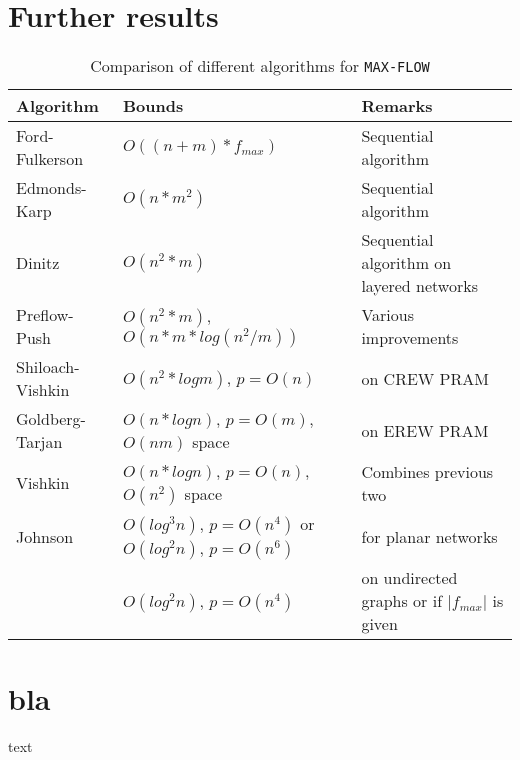 \documentclass[a4paper,10pt, twocolumn]{article}
\begin{document}
\section{Further results}
\label{sec:further}

\begin{table*}
\begin{tabular}{|l|l|l|}
\hline
Algorithm & Bounds & Remarks \\
\hline
Ford-Fulkerson\cite{ahuja93} & $O((n+m) * f_{max})$ & Sequential algorithm \\
Edmonds-Karp\cite{ahuja93} & $O(n*m^2)$ & Sequential algorithm  \\
Dinitz\cite{dinitz70}& $O(n^2*m)$ & Sequential algorithm on layered networks\\
Preflow-Push\cite{ahuja93} & $O(n^2*m)$, $O(n*m*log(n^2/m))$ & Various improvements\\
Shiloach-Vishkin\cite{yossi81} & $O(n^2*log m)$, $p=O(n)$ & on CREW PRAM\\
Goldberg-Tarjan\cite{goldberg89} & $O(n*log n)$, $p=O(m)$, $O(nm)$ space & on EREW PRAM \\
Vishkin\cite{vishkin92} & $O(n*log n)$, $p=O(n)$, $O(n^2)$ space & Combines previous two\\
Johnson\cite{johnson87} & $O(log^{3} n)$, $p=O(n^{4})$ or $O(log^{2} n)$, $p=O(n^{6})$ &
for planar networks\\
 & $	O(log^{2} n)$, $p=O(n^{4})$ & on undirected graphs or if  $\lvert f_{max} \rvert$ is given\\
\hline
\end{tabular}
\caption{Comparison of different algorithms for \lstinline|MAX-FLOW|}
\label{tbl:results}
\end{table*}


\section{bla}
text \cite{ahuja93} \cite{papa95} \cite{yossi81} \cite{vishkin92} \cite{goldberg89} \cite{goldberg91} \cite{goldberg98} \cite{johnson87} \cite{schieber89} \cite{cherivan89} 

\printbibliography
\end{document}
